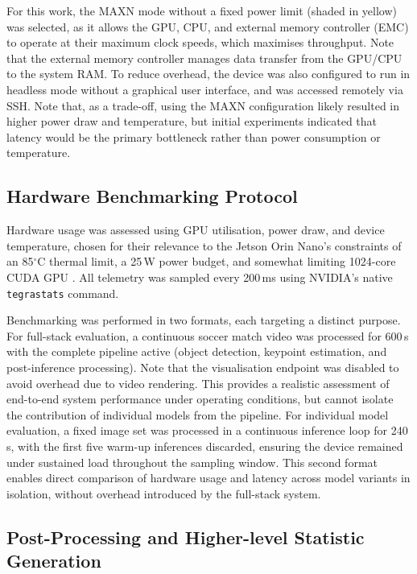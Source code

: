 For this work, the MAXN mode without a fixed power limit (shaded in yellow) was selected, as it allows the GPU, CPU, and external memory controller (EMC) to operate at their maximum clock speeds, which maximises throughput. Note that the external memory controller manages data transfer from the GPU/CPU to the system RAM. To reduce overhead, the device was also configured to run in headless mode without a graphical user interface, and was accessed remotely via SSH. Note that, as a trade-off, using the MAXN configuration likely resulted in higher power draw and temperature, but initial experiments indicated that latency would be the primary bottleneck rather than power consumption or temperature.


\subsection{Hardware Benchmarking Protocol}

Hardware usage was assessed using GPU utilisation, power draw, and device temperature, chosen for their relevance to the Jetson Orin Nano's constraints of an 85$^\circ$C thermal limit, a 25\,W power budget, and somewhat limiting 1024-core CUDA GPU \cite{JetsonOrinNano}. All telemetry was sampled every 200\,ms using NVIDIA's native \verb|tegrastats| command.

Benchmarking was performed in two formats, each targeting a distinct purpose. For full-stack evaluation, a continuous soccer match video was processed for 600\,s with the complete pipeline active (object detection, keypoint estimation, and post-inference processing). Note that the visualisation endpoint was disabled to avoid overhead due to video rendering. This provides a realistic assessment of end-to-end system performance under operating conditions, but cannot isolate the contribution of individual models from the pipeline. For individual model evaluation, a fixed image set was processed in a continuous inference loop for 240\,s, with the first five warm-up inferences discarded, ensuring the device remained under sustained load throughout the sampling window. This second format enables direct comparison of hardware usage and latency across model variants in isolation, without overhead introduced by the full-stack system.


\subsection{Post-Processing and Higher-level Statistic Generation}
\label{subsec:postprocessing}

